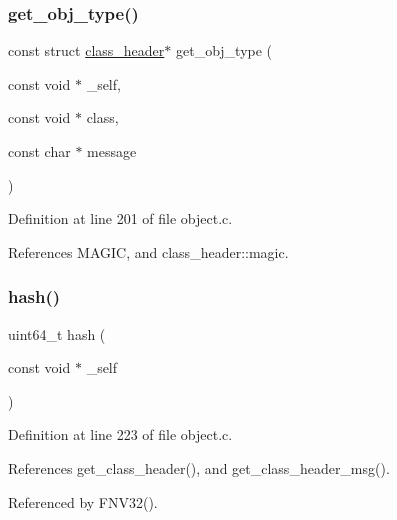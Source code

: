 \mbox{\label{group__collection_gabf324b663150d7bbcfe0e3b84b21102f}} 
\subsubsection{\texorpdfstring{get\+\_\+obj\+\_\+type()}{get\_obj\_type()}}
{\footnotesize\ttfamily const struct \mbox{\hyperlink{structclass__header}{class\+\_\+header}}$\ast$ get\+\_\+obj\+\_\+type (\begin{DoxyParamCaption}\item[{const void $\ast$}]{\+\_\+self,  }\item[{const void $\ast$}]{class,  }\item[{const char $\ast$}]{message }\end{DoxyParamCaption})\hspace{0.3cm}{\ttfamily [inline]}}



Definition at line 201 of file object.\+c.



References M\+A\+G\+IC, and class\+\_\+header\+::magic.

\mbox{\label{group__collection_gae0b3682e6ff5038e94c9e551bdd0d489}} 
\subsubsection{\texorpdfstring{hash()}{hash()}}
{\footnotesize\ttfamily uint64\+\_\+t hash (\begin{DoxyParamCaption}\item[{const void $\ast$}]{\+\_\+self }\end{DoxyParamCaption})}



Definition at line 223 of file object.\+c.



References get\+\_\+class\+\_\+header(), and get\+\_\+class\+\_\+header\+\_\+msg().



Referenced by F\+N\+V32().

\mbox{\label{group__collection_ga0cb67414335937707c9b92809a10895b}} 
